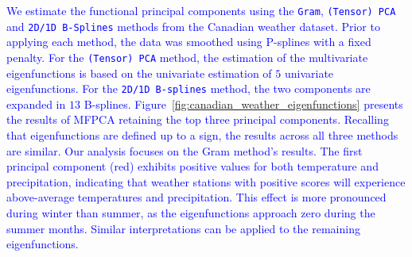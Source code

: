 \textcolor{blue}{We estimate the functional principal components using the \texttt{Gram}, \texttt{(Tensor) PCA} and \texttt{2D/1D B-Splines} methods from the Canadian weather dataset. Prior to applying each method, the data was smoothed using P-splines with a fixed penalty. For the \texttt{(Tensor) PCA} method, the estimation of the multivariate eigenfunctions is based on the univariate estimation of $5$ univariate eigenfunctions. For the \texttt{2D/1D B-splines} method, the two components are expanded in $13$ B-splines.  Figure~\ref{fig:canadian_weather_eigenfunctions} presents the results of MFPCA retaining the top three principal components. Recalling that eigenfunctions are defined up to a sign, the results across all three methods are similar. Our analysis focuses on the Gram method's results. The first principal component (red) exhibits positive values for both temperature and precipitation, indicating that weather stations with positive scores will experience above-average temperatures and precipitation. This effect is more pronounced during winter than summer, as the eigenfunctions approach zero during the summer months. Similar interpretations can be applied to the remaining eigenfunctions.}
